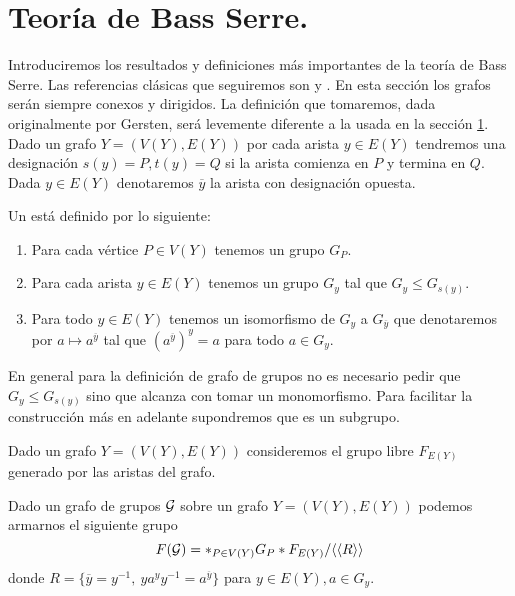 \documentclass[tesis.tex]{subfiles}
\begin{document}
\chapter{Teoría de Bass Serre.}

Introduciremos los resultados y definiciones más importantes de la teoría de Bass Serre. 
Las referencias clásicas que seguiremos son \cite{serre2002trees} y \cite{}.
En esta sección los grafos serán siempre conexos y dirigidos.
La definición que tomaremos, dada originalmente por Gersten, será levemente diferente a la usada en la sección \ref{}.
Dado un grafo $Y= (V(Y),E(Y))$ por cada arista $y \in E(Y)$ tendremos una designación $s(y) = P, t(y) = Q$ si la arista comienza en $P$ y termina en $Q$.
Dada $y \in E(Y)$ denotaremos $\overline y$ la arista con designación opuesta.

\begin{deff}
	Un  está definido por lo siguiente:
	\begin{enumerate}
		\item Para cada vértice $P \in V(Y)$ tenemos un grupo $G_P$.
		\item  Para cada arista $y \in E(Y)$ tenemos un grupo $G_y$ tal que $G_y \le G_{s(y)}$.
		\item Para todo $y \in E(Y)$ tenemos un isomorfismo de $G_y$ a $G_{\overline y}$ que denotaremos por $a \mapsto a^{\overline y} $ tal que $(a^{\overline y})^y  = a$ para todo $a \in G_y$.
	\end{enumerate}
\end{deff}

En general para la definición de grafo de grupos no es necesario pedir que $G_y \le G_{s(y)}$ sino que alcanza con tomar un monomorfismo. 
Para facilitar la construcción más en adelante supondremos que es un subgrupo.

Dado un grafo $Y = (V(Y), E(Y))$ consideremos el grupo libre $F_{E(Y)}$ generado por las aristas del grafo.

\begin{deff}
	Dado un grafo de grupos $\cal G$ sobre un grafo $Y = (V(Y), E(Y))$ podemos armarnos el siguiente grupo 
	\begin{equation*}
		F({\cal G}) = \ast_{P \in V(Y)} G_P \ast F_{E(Y)} / \langle \langle  R \rangle \rangle
	\end{equation*}
	donde $R = \{  \overline y = y^{-1}, \ ya^yy^{-1} = a^{\overline y} \}$ para $y \in E(Y), a \in G_y$. 
\end{deff}
\end{document}
